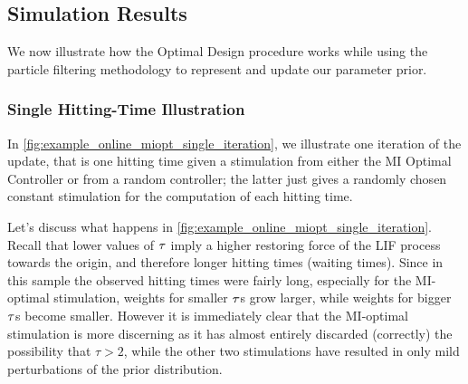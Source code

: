 \documentclass{article}
\begin{document}
% 


\subsection{Simulation Results}
We now illustrate how the Optimal Design procedure works while using the
particle filtering methodology to represent and update our parameter prior.

\subsubsection{Single Hitting-Time Illustration}
In \cref{fig:example_online_miopt_single_iteration}, we
illustrate one iteration of the update, that is one hitting time given a
stimulation from either the MI Optimal Controller or from a random controller; the latter 
just gives a randomly chosen constant stimulation for the computation of each hitting time.

Let's discuss what happens in \cref{fig:example_online_miopt_single_iteration}.
Recall that lower values of ${ \tau }$ imply a higher restoring force of the LIF
process towards the origin, and therefore longer hitting times (waiting times).
Since in this sample the observed hitting times were fairly long, especially for
the MI-optimal stimulation, weights for smaller ${\tau}$s grow larger, while weights
for bigger ${\tau}$s become smaller. However it is immediately clear that the
MI-optimal stimulation is more discerning as it has almost entirely discarded
(correctly) the possibility that $\tau>2$, while the other two stimulations have
resulted in only mild perturbations of the prior distribution.
\end{document}
